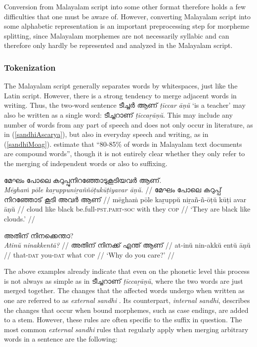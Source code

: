 \documentclass[a4paper]{article}
\newcommand{\afx}[1]{\textsc{#1}}
\begin{document}
Conversion from Malayalam script into some other format therefore holds a few difficulties that one must be aware of. However, converting Malayalam script into some alphabetic representation is an important preprocessing step for morpheme splitting, since Malayalam morphemes are not necessarily syllabic and can therefore only hardly be represented and analyzed in the Malayalam script.

\subsubsection{Tokenization}

The Malayalam script generally separates words by whitespaces, just like the Latin script. However, there is a strong tendency to merge adjacent words in writing. Thus, the two-word sentence ടീച്ചർ ആണ് \textit{ṭīccar āṇŭ} `is a teacher' may also be written as a single word: ടീച്ചറാണ് \textit{ṭīccaṟāṇŭ}. This may include any number of words from any part of speech and does not only occur in literature, as in (\ref{sandhiAscarya}), but also in everyday speech and writing, as in (\ref{sandhiMoag}). \textcite{bindu2011pos} estimate that ``80-85\% of words in Malayalam text documents are compound words'', though it is not entirely clear whether they only refer to the merging of independent words or also to suffixing.

\ex\label{sandhiAscarya}\begingl
\glpreamble മേഘം പോലെ കറുപ്പുനിറഞ്ഞോടുകൂടിയവർ ആണ്. \\
\textit{Mēghaṁ pōle kaṟuppuniṟaññōṭukūṭiyavar āṇŭ.} //
\gla മേഘം പോലെ കറുപ്പ് നിറഞ്ഞോട് കൂടി അവർ ആണ് //
\glb mēghaṁ pōle kaṟuppŭ niṟañ-ñ-ōṭŭ kūṭi avar āṇŭ //
\glc cloud like black be.full-\afx{pst.part}-\afx{soc} with they \afx{cop} //
\glft `They are black like clouds.' \parencite[p.~179]{ascaryacudamani} //
\endgl\xe


\ex\label{sandhiMoag}\begingl
\glpreamble അതിന് നിനക്കെന്താ? \\
\textit{Atinŭ ninakkentā?} //
\gla അതിന് നിനക്ക് എന്ത് ആണ് //
\glb at-inŭ nin-akkŭ entŭ āṇŭ //
\glc that-\afx{dat} you-\afx{dat} what \afx{cop} //
\glft `Why do you care?' \parencite[p.~165]{moag} //
\endgl\xe

The above examples already indicate that even on the phonetic level this process is not always as simple as in ടീച്ചറാണ് \textit{ṭīccaṟāṇŭ}, where the two words are just merged together. The changes that the affected words undergo when written as one are referred to as \textit{external sandhi} \parencite{devadath2014sandhi}. Its counterpart, \textit{internal sandhi}, describes the changes that occur when bound morphemes, such as case endings, are added to a stem. However, these rules are often specific to the suffix in question. The most common \textit{external sandhi} rules that regularly apply when merging arbitrary words in a sentence are the following:
\end{document}
